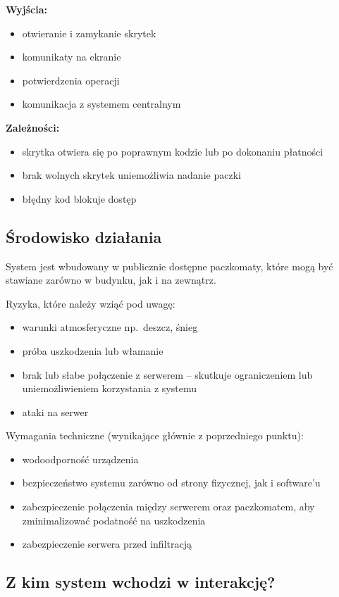 \documentclass[a4paper,12pt]{article}
\begin{document}
\noindent\textbf{Wyjścia:}
\begin{itemize}
  \item otwieranie i zamykanie skrytek
  \item komunikaty na ekranie
  \item potwierdzenia operacji
  \item komunikacja z systemem centralnym
\end{itemize}

\noindent\textbf{Zależności:}
\begin{itemize}
  \item skrytka otwiera się po poprawnym kodzie lub po dokonaniu płatności
  \item brak wolnych skrytek uniemożliwia nadanie paczki
  \item błędny kod blokuje dostęp
\end{itemize}

\subsection{Środowisko działania}
System jest wbudowany w publicznie dostępne paczkomaty, które mogą być
stawiane zarówno w budynku, jak i na zewnątrz.

\noindent Ryzyka, które należy wziąć pod uwagę:
\begin{itemize}
  \item warunki atmosferyczne np.\ deszcz, śnieg
  \item próba uszkodzenia lub włamanie
  \item brak lub słabe połączenie z serwerem -- skutkuje ograniczeniem lub uniemożliwieniem korzystania z systemu
  \item ataki na serwer
\end{itemize}

\noindent Wymagania techniczne (wynikające głównie z poprzedniego punktu):
\begin{itemize}
  \item wodoodporność urządzenia
  \item bezpieczeństwo systemu zarówno od strony fizycznej, jak i software'u
  \item zabezpieczenie połączenia między serwerem oraz paczkomatem, aby zminimalizować podatność na uszkodzenia
  \item zabezpieczenie serwera przed infiltracją
\end{itemize}

\subsection{Z kim system wchodzi w interakcję?}
\end{document}
